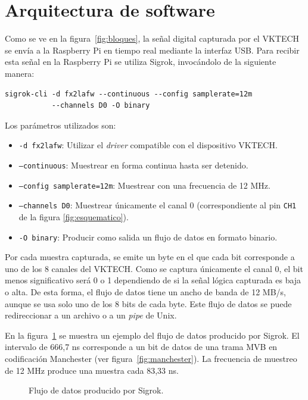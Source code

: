 \section{Arquitectura de software}
\label{sec:software}

Como se ve en la figura~\ref{fig:bloques}, la señal digital capturada por el VKTECH se envía a la Raspberry Pi en tiempo real mediante la interfaz USB. Para recibir esta señal en la Raspberry Pi se utiliza Sigrok, invocándolo de la siguiente manera:

\begin{lstlisting}
sigrok-cli -d fx2lafw --continuous --config samplerate=12m
           --channels D0 -O binary
\end{lstlisting}

Los parámetros utilizados son:

\begin{itemize}
        \item \texttt{-d fx2lafw}: Utilizar el \textit{driver} compatible con el dispositivo VKTECH.
        \item \texttt{--continuous}: Muestrear en forma continua hasta ser detenido.
        \item \texttt{--config samplerate=12m}: Muestrear con una frecuencia de 12 MHz.
        \item \texttt{--channels D0}: Muestrear únicamente el canal 0 (correspondiente al pin \texttt{CH1} de la figura \ref{fig:esquematico}).
        \item \texttt{-O binary}: Producir como salida un flujo de datos en formato binario.
\end{itemize}

Por cada muestra capturada, se emite un byte en el que cada bit corresponde a uno de los 8 canales del VKTECH.
Como se captura únicamente el canal 0, el bit menos significativo será 0 o 1 dependiendo de si la señal lógica capturada es baja o alta.
De esta forma, el flujo de datos tiene un ancho de banda de 12 MB/s, aunque se usa solo uno de los 8 bits de cada byte.
Este flujo de datos se puede redireccionar a un archivo o a un \textit{pipe} de Unix.

En la figura~\ref{fig:sigrok} se muestra un ejemplo del flujo de datos producido por Sigrok. El intervalo de 666,7 ns corresponde a un bit de datos de una trama MVB en codificación Manchester (ver figura~\ref{fig:manchester}). La frecuencia de muestreo de 12 MHz produce una muestra cada 83,33 ns.

\begin{figure}[htbp]
	\centering
    {
        \fontsize{9pt}{9pt}\selectfont
        
    }
	\caption{Flujo de datos producido por Sigrok.}
    \label{fig:sigrok}
\end{figure}

